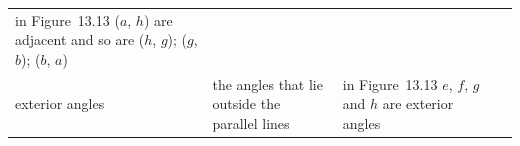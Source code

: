 \begin{table}[H]
\begin{center}
\begin{xtabular*}{\mytablewidth}[t]{|p{3cm}|p{3cm}|p{3cm}|p{20\mystarwidth}|}
        in Figure~13.13 (\begin{math}a\end{math}, \begin{math}h\end{math}) are adjacent and so are (\begin{math}h\end{math}, \begin{math}g\end{math}); (\begin{math}g\end{math}, \begin{math}b\end{math}); (\begin{math}b\end{math}, \begin{math}a\end{math}) &
    
    
     \tabularnewline{}
    
    
        exterior angles &
    
    
        the angles that lie outside the parallel lines &
    
    
        in Figure~13.13 \begin{math}e\end{math}, \begin{math}f\end{math}, \begin{math}g\end{math} and \begin{math}h\end{math} are exterior angles &
    

\end{xtabular*}
\end{center}
\end{table}
